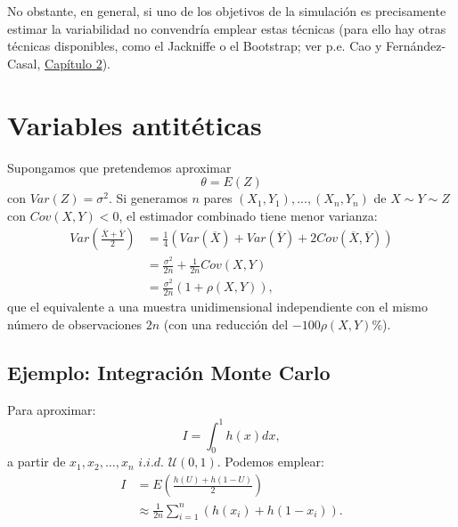 \documentclass[
]{book}
\theoremstyle{break}
\theoremstyle{definition}
\theoremstyle{definition}
\theoremstyle{definition}
\theoremstyle{remark}
\begin{document}
No obstante, en general, si uno de los objetivos de la simulación es precisamente estimar la variabilidad no convendría emplear estas técnicas
(para ello hay otras técnicas disponibles, como el Jackniffe o el Bootstrap; ver p.e. Cao y Fernández-Casal, \href{https://rubenfcasal.github.io/book_remuestreo/prec-sesgo.html}{Capítulo 2}).

\hypertarget{variables-antituxe9ticas}{%
\section{Variables antitéticas}\label{variables-antituxe9ticas}}

Supongamos que pretendemos aproximar
\[\theta=E\left(  Z\right)\]
con \(Var\left( Z \right) = \sigma^{2}\).
Si generamos \(n\) pares
\(\left( X_{1},Y_{1}\right), ... ,\left( X_{n},Y_{n}\right)\)
de \(X\sim Y\sim Z\) con \(Cov\left( X,Y\right) < 0\),
el estimador combinado tiene menor varianza:
\[\begin{aligned}
    Var\left(  \frac{\overline{X}+\overline{Y}}{2}\right)   & =\frac{1}{4}\left(
    Var\left(  \overline{X}\right)  +Var\left(  \overline{Y}\right)  +2Cov\left(
    \overline{X},\overline{Y}\right)  \right) \\
    & =\frac{\sigma^{2}}{2n}+\frac{1}{2n}Cov\left(  X,Y\right) \\
    & =\frac{\sigma^{2}}{2n}\left(  1+\rho \left(  X,Y\right)  \right),
\end{aligned}\]
que el equivalente a una muestra unidimensional independiente con el
mismo número de observaciones \(2n\) (con una reducción del
\(-100\rho \left( X,Y\right) \%\)).

\hypertarget{ejemplo-integraciuxf3n-monte-carlo}{%
\subsection{Ejemplo: Integración Monte Carlo}\label{ejemplo-integraciuxf3n-monte-carlo}}

Para aproximar:
\[I=\int_{0}^{1}h\left(  x\right) dx,\]
a partir de \(x_{1},x_{2},\ldots,x_{n}\) \(i.i.d.\)
\(\mathcal{U}\left(0,1\right)\).
Podemos emplear:
\[\begin{aligned}
    I  & =E\left(  \frac{h\left(  U\right)  +h\left(  1-U\right)  }{2}\right) \\
    & \approx \frac{1}{2n}\sum \limits_{i=1}^{n}\left(  h\left(  x_{i}\right)
    +h\left(  1-x_{i}\right)  \right).
\end{aligned}\]
\end{document}
